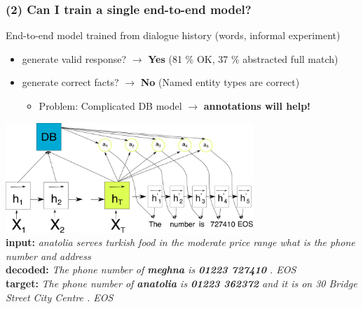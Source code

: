 \documentclass[10pt, compress,british,xcolor={svgnames,dvipsnames,x11names},trans]{beamer}
\begin{document}
\begin{frame}\frametitle{(2) Can I train a single end-to-end model? }
    End-to-end model trained from dialogue history (words, informal experiment)
    \begin{itemize}
        \item generate valid response? $\longrightarrow$ {\bf Yes} {\footnotesize (81 \% OK, 37 \% abstracted full match)}
        \item generate correct facts? $\longrightarrow$ {\bf No} {\footnotesize (Named entity types are correct)} 
            \begin{itemize}
                \item Problem: Complicated DB model $\longrightarrow$ {\bf annotations will help!}
            \end{itemize}
    \end{itemize}
    \includegraphics[width=0.7\textwidth]{./encdecdb.pdf} \\
    {\bf input:} {\it anatolia serves turkish food in the moderate price range what is the phone number and address} \\
    {\bf decoded:} {\it The phone number of {\bf meghna} is {\bf 01223 727410} . EOS} \\
    {\bf target:} {\it The phone number of {\bf anatolia} is {\bf 01223 362372} and it is on 30 Bridge Street City Centre . EOS } \\
\end{frame}
\end{document}
